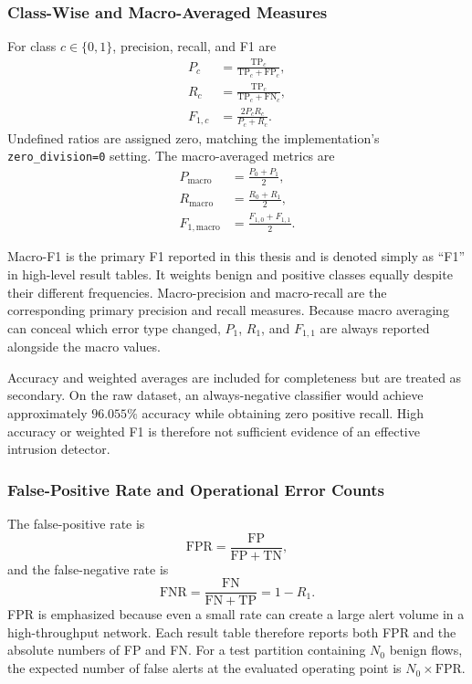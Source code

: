 \documentclass[11pt,fleqn]{report}
\begin{document}
\subsubsection{Class-Wise and Macro-Averaged Measures}
\label{subsubsec:macro_metrics}

For class $c\in\{0,1\}$, precision, recall, and F1 are
\begin{align}
    P_c &= \frac{\mathrm{TP}_c}
    {\mathrm{TP}_c+\mathrm{FP}_c}, \\
    R_c &= \frac{\mathrm{TP}_c}
    {\mathrm{TP}_c+\mathrm{FN}_c}, \\
    F_{1,c} &= \frac{2P_cR_c}{P_c+R_c}.
    \label{eq:classwise_metrics}
\end{align}
Undefined ratios are assigned zero, matching the implementation's
\texttt{zero\_division=0} setting. The macro-averaged metrics are
\begin{align}
    P_{\mathrm{macro}} &= \frac{P_0+P_1}{2}, \\
    R_{\mathrm{macro}} &= \frac{R_0+R_1}{2}, \\
    F_{1,\mathrm{macro}} &= \frac{F_{1,0}+F_{1,1}}{2}.
    \label{eq:experimental_macro_metrics}
\end{align}

Macro-F1 is the primary F1 reported in this thesis and is denoted simply as
``F1'' in high-level result tables. It weights benign and positive classes
equally despite their different frequencies. Macro-precision and macro-recall
are the corresponding primary precision and recall measures. Because macro
averaging can conceal which error type changed, $P_1$, $R_1$, and $F_{1,1}$
are always reported alongside the macro values.

Accuracy and weighted averages are included for completeness but are treated
as secondary. On the raw dataset, an always-negative classifier would achieve
approximately $96.055\%$ accuracy while obtaining zero positive recall. High
accuracy or weighted F1 is therefore not sufficient evidence of an effective
intrusion detector.

\subsubsection{False-Positive Rate and Operational Error Counts}
\label{subsubsec:fpr_metric}

The false-positive rate is
\begin{equation}
    \mathrm{FPR}=\frac{\mathrm{FP}}{\mathrm{FP}+\mathrm{TN}},
    \label{eq:false_positive_rate}
\end{equation}
and the false-negative rate is
\begin{equation}
    \mathrm{FNR}=\frac{\mathrm{FN}}{\mathrm{FN}+\mathrm{TP}}
    =1-R_1.
    \label{eq:false_negative_rate}
\end{equation}
FPR is emphasized because even a small rate can create a large alert volume in
a high-throughput network. Each result table therefore reports both FPR and the
absolute numbers of FP and FN. For a test partition containing $N_0$ benign
flows, the expected number of false alerts at the evaluated operating point is
$N_0\times\mathrm{FPR}$.
\end{document}
